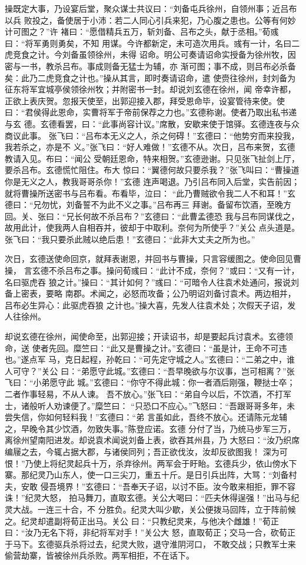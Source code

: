 操既定大事，乃设宴后堂，聚众谋士共议曰：“刘备屯兵徐州，自领州事；近吕布以兵
败投之，备使居于小沛：若二人同心引兵来犯，乃心腹之患也。公等有何妙计可图之？”许
褚曰：“愿借精兵五万，斩刘备、吕布之头，献于丞相。”荀彧曰：“将军勇则勇矣，不知
用谋。今许都新定，未可造次用兵。彧有一计，名曰二虎竞食之计。今刘备虽领徐州，未得
诏命。明公可奏请诏命实授备为徐州牧，因密与一书，教杀吕布。事成则备无猛士为辅，亦
渐可图；事不成，则吕布必杀备矣：此乃二虎竞食之计也。”操从其言，即时奏请诏命，遣
使赍往徐州，封刘备为征东将军宜城亭侯领徐州牧；并附密书一封。却说刘玄德在徐州，闻
帝幸许都，正欲上表庆贺。忽报天使至，出郭迎接入郡，拜受恩命毕，设宴管待来使。使
曰：“君侯得此恩命，实曹将军于帝前保荐之力也。”玄德称谢。使者乃取出私书递与玄
德。玄德看罢，曰：“此事尚容计议。”席散，安歇来使于馆驿。玄德连夜与众商议此事。
张飞曰：“吕布本无义之人，杀之何碍！”玄德曰：“他势穷而来投我，我若杀之，亦是不
义。”张飞曰：“好人难做！”玄德不从。次日，吕布来贺，玄德教请入见。布曰：“闻公
受朝廷恩命，特来相贺。”玄德逊谢。只见张飞扯剑上厅，要杀吕布。玄德慌忙阻住。布大
惊曰：“翼德何故只要杀我？”张飞叫曰：“曹操道你是无义之人，教我哥哥杀你！”玄德
连声喝退。乃引吕布同入后堂，实告前因；就将曹操所送密书与吕布看。布看毕，泣曰：
“此乃曹贼欲令我二人不和耳！”玄德曰：“兄勿忧，刘备誓不为此不义之事。”吕布再三
拜谢。备留布饮酒，至晚方回。关、张曰：“兄长何故不杀吕布？”玄德曰：“此曹孟德恐
我与吕布同谋伐之，故用此计，使我两人自相吞并，彼却于中取利。奈何为所使乎？”关公
点头道是。张飞曰：“我只要杀此贼以绝后患！”玄德曰：“此非大丈夫之所为也。”

次日，玄德送使命回京，就拜表谢恩，并回书与曹操，只言容缓图之。使命回见曹操，
言玄德不杀吕布之事。操问荀彧曰：“此计不成，奈何？”或曰：“又有一计，名曰驱虎吞
狼之计。”操曰：“其计如何？”彧曰：“可暗令人往袁术处通问，报说刘备上密表，要略
南郡。术闻之，必怒而攻备；公乃明诏刘备讨袁术。两边相并，吕布必生异心：此驱虎吞狼
之计也。”操大喜，先发人往袁术处；次假天子诏，发人往徐州。

却说玄德在徐州，闻使命至，出郭迎接；开读诏书，却是要起兵讨袁术。玄德领命，送
使者先回。糜竺曰：“此又是曹操之计。”玄德曰：“虽是计，王命不可违也。”遂点军
马，克日起程，孙乾曰：“可先定守城之人。”玄德曰：“二弟之中，谁人可守？”关公
曰：“弟愿守此城。”玄德曰：“吾早晚欲与尔议事，岂可相离？”张飞曰：“小弟愿守此
城。”玄德曰：“你守不得此城：你一者酒后刚强，鞭挞士卒；二者作事轻易，不从人谏。
吾不放心。”张飞曰：“弟自今以后，不饮酒，不打军士，诸般听人劝谏便了。”糜竺曰：
“只恐口不应心。”飞怒曰：“吾跟哥哥多年，未尝失信，你如何轻料我！”玄德曰：“弟
言虽如此，吾终不放心。还请陈元龙辅之，早晚令其少饮酒，勿致失事。”陈登应诺。玄德
分付了当，乃统马步军三万，离徐州望南阳进发。却说袁术闻说刘备上表，欲吞其州县，乃
大怒曰：“汝乃织席编屦之去，今辄占据大郡，与诸侯同列；吾正欲伐汝，汝却反欲图我！
深为可恨！”乃使上将纪灵起兵十万，杀弃徐州。两军会于盱眙。玄德兵少，依山傍水下
寨。那纪灵乃山东人，使一口三尖刀，重五十斤。是日引兵出阵，大骂：“刘备村夫，安敢
侵吾境界！”玄德曰：“吾奉天子诏，以讨不臣。汝今敢来相拒，罪不容诛！”纪灵大怒，
拍马舞刀，直取玄德。关公大喝曰：“匹夫休得逞强！”出马与纪灵大战。一连三十合，不
分胜负。纪灵大叫少歇，关公便拨马回阵，立于阵前候之。纪灵却遣副将荀正出马。关公
曰：“只教纪灵来，与他决个雌雄！”荀正曰：“汝乃无名下将，非纪将军对手！”关公大
怒，直取荀正；交马一合，砍荀正于马下。玄德驱兵杀将过去，纪灵大败，退守淮阴河口，
不敢交战；只教军士来偷营劫寨，皆被徐州兵杀败。两军相拒，不在话下。

